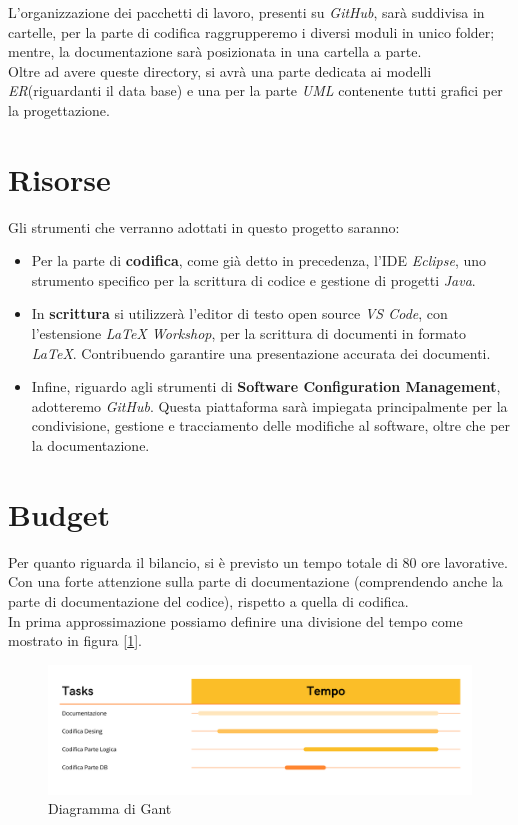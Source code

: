 \documentclass[12pt, letterpaper]{book}
\begin{document}
L'organizzazione dei pacchetti di lavoro, presenti su \textit{GitHub}, sarà suddivisa in cartelle, per la parte di codifica raggrupperemo i diversi moduli in unico folder; mentre, la documentazione sarà posizionata in una cartella a parte.\\

Oltre ad avere queste directory, si avrà una parte dedicata ai modelli \textit{ER}(riguardanti il data base) e una per la parte \textit{UML} contenente tutti grafici per la progettazione. 

\section{Risorse}

Gli strumenti che verranno adottati in questo progetto saranno:
\begin{itemize}
    \item Per la parte di \textbf{codifica}, come già detto in precedenza, l'IDE \textit{Eclipse}, uno strumento specifico per la scrittura di codice e gestione di progetti \textit{Java}.
    \item In \textbf{scrittura} si utilizzerà l'editor di testo open source \textit{VS Code}, con l'estensione \textit{LaTeX Workshop}, per la scrittura di documenti in formato \textit{LaTeX}. Contribuendo garantire una presentazione accurata dei documenti.
    \item Infine, riguardo agli strumenti di \textbf{Software Configuration Management}, adotteremo \textit{GitHub}. Questa piattaforma sarà impiegata principalmente per la condivisione, gestione e tracciamento delle modifiche al software, oltre che per la documentazione. 

\end{itemize}

\section{Budget}

    Per quanto riguarda il bilancio, si è previsto un tempo totale di 80 ore lavorative. Con una forte attenzione sulla parte di documentazione (comprendendo anche la parte di documentazione del codice), rispetto a quella di codifica.\\

    In prima approssimazione possiamo definire una divisione del tempo come mostrato in figura [\ref{fig: diagramma_gant}]. 
    \begin{figure}[h]
        \centering
        \includegraphics[width = 1\linewidth]{Diagramma_Gant.jpg}
        \caption{Diagramma di Gant}
        \label{fig: diagramma_gant}    
    \end{figure}
\end{document}
